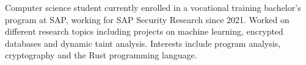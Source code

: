 

\begin{cvparagraph}

Computer science student currently enrolled in a vocational training bachelor's program at SAP, working
for SAP Security Research since 2021. Worked on different research topics including projects on machine learning, encrypted databases and dynamic taint analysis.
Interests include program analysis, cryptography and the Rust programming language.
\end{cvparagraph}
